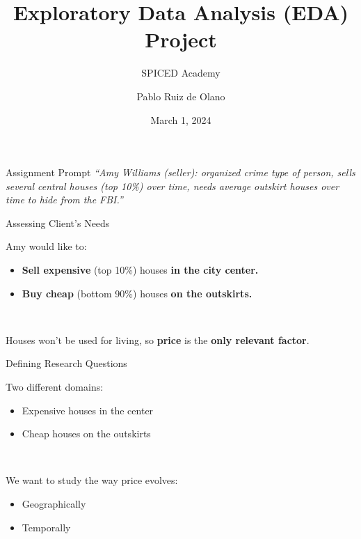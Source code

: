 \documentclass{beamer}
\begin{document}
\title{Exploratory Data Analysis (EDA) Project}
\subtitle{SPICED Academy}
\author{Pablo Ruiz de Olano}
\date{March 1, 2024}

\begin{frame}
\maketitle
\end{frame}

\begin{frame}{}

\begin{exampleblock}{Assignment Prompt} 
\emph{``Amy Williams (seller): organized crime type of person, sells several central houses (top 10\%) over time, needs average outskirt houses over time to hide from the FBI.''}
\end{exampleblock} 

\end{frame}

\begin{frame}{Assessing Client's Needs}

Amy would like to: \pause

\begin{itemize}
\item{\textbf{Sell expensive} (top 10\%) houses \textbf{in the city center.}} 
\item{\textbf{Buy cheap} (bottom 90\%) houses \textbf{on the outskirts.}}
\end{itemize} \pause

\

Houses won't be used for living, so \textbf{price} is the \textbf{only relevant factor}. 

\end{frame}

\begin{frame}{Defining Research Questions}

Two different domains: \pause

\begin{itemize}
\item{Expensive houses in the center} 
\item{Cheap houses on the outskirts}
\end{itemize} \pause

\

We want to study the way price evolves:

\begin{itemize}
\item{Geographically} 
\item{Temporally}
\end{itemize}


\end{frame}
\end{document}
